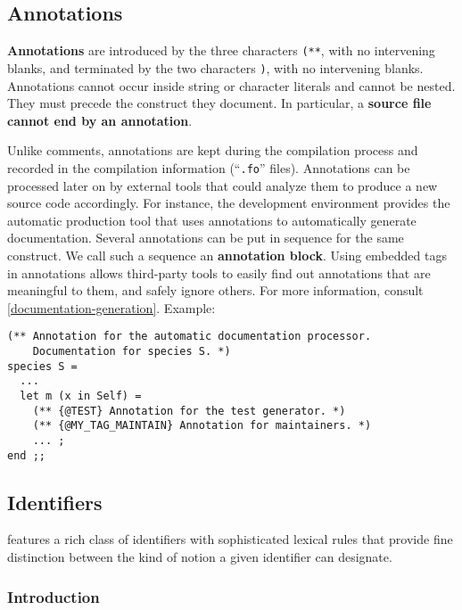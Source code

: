 \subsection{Annotations}
\label{annotation}
{\bf Annotations} are introduced by the three characters {\tt (**},
with no intervening blanks, and terminated by the two characters
{\tt *)}, with no intervening blanks.
Annotations cannot occur inside string or character literals and
cannot be nested. They must precede the construct they document.
In particular, a {\bf source file cannot end by an annotation}.

Unlike comments, annotations are kept during the compilation process
and recorded in the compilation information (``{\tt .fo}'' files). Annotations can
be processed later on by external tools that could analyze them to
produce a new {\focal} source code accordingly.
For instance, the {\focal} development environment provides the {\focdoc}
automatic production tool that uses annotations to automatically generate
documentation.
Several annotations can be put in sequence for the same construct. We call
such a sequence an {\bf annotation block}.
Using embedded tags in annotations allows third-party tools to easily find
out annotations that are meaningful to them, and safely ignore others.
For more information, consult
\ref{documentation-generation}.
Example:
{\scriptsize
\begin{lstlisting}
(** Annotation for the automatic documentation processor.
    Documentation for species S. *)
species S =
  ...
  let m (x in Self) =
    (** {@TEST} Annotation for the test generator. *)
    (** {@MY_TAG_MAINTAIN} Annotation for maintainers. *)
    ... ;
end ;;
\end{lstlisting}
}

\subsection{Identifiers}
\vspace{0.2cm}

{\focal} features a rich class of identifiers with sophisticated lexical
rules that provide fine distinction between the kind of notion a given
identifier can designate.

\subsubsection{Introduction}

